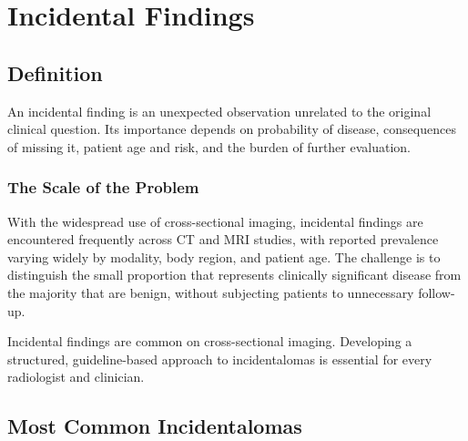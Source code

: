 \chapter{Incidental Findings}

\label{ch:ch37_incidental_findings}

\section{Definition}
An incidental finding is an unexpected observation unrelated to the original clinical question. Its importance depends on probability of disease, consequences of missing it, patient age and risk, and the burden of further evaluation.

\subsection{The Scale of the Problem}
With the widespread use of cross-sectional imaging, incidental findings are encountered frequently across CT and MRI studies, with reported prevalence varying widely by modality, body region, and patient age. The challenge is to distinguish the small proportion that represents clinically significant disease from the majority that are benign, without subjecting patients to unnecessary follow-up.

\begin{pearlbox}
Incidental findings are common on cross-sectional imaging. Developing a structured, guideline-based approach to incidentalomas is essential for every radiologist and clinician.
\end{pearlbox}

\section{Most Common Incidentalomas}

